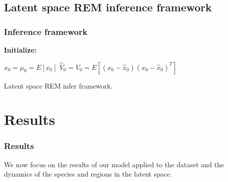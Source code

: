 \documentclass[
	11pt, %
]{beamer}
\begin{document}
%
%
%
%
%

\subsection{Latent space REM inference framework}
\begin{frame}
\frametitle{Inference framework}
\smallskip

\begin{algorithm}[H]

\textbf{Initialize: }
\begin{substeps}
$\hat{x}_0 = \mu_0 = E[x_0]$ \;
$\hat{V}_0 = V_0 = E[(x_0-\hat{x}_0)(x_0-\hat{x}_0)^T]$  \;
\end{substeps}
\caption{Latent space REM infer framework.}
\label{algo:rem_latent}
\end{algorithm}
\end{frame}

\section{Results}
\begin{frame}
\frametitle{Results}

We now focus on the results of our model applied to the dataset and the dynamics of the species and regions in the latent space.
\end{frame}
%
%
\end{document}
